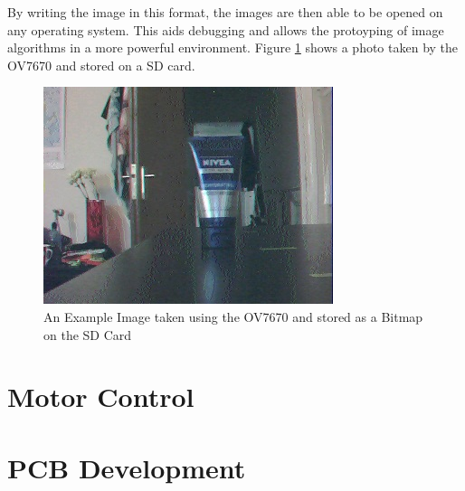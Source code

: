 By writing the image in this format, the images are then able to be opened on any operating system. This aids debugging and allows the protoyping of image algorithms in a more powerful environment. Figure \ref{ExampleImage} shows a photo taken by the OV7670 and stored on a SD card.

\begin{figure}
\begin{center}
\includegraphics{Figures/ExampleImageFromCamera.jpg} 
\end{center}
\caption{An Example Image taken using the OV7670 and stored as a Bitmap on the SD Card}
\label{ExampleImage}
\end{figure}


\section{Motor Control}
\section{PCB Development}

